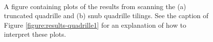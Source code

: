 \documentclass[12pt]{amsbook}
\theoremstyle{plain}
\theoremstyle{definition}
\theoremstyle{remark}
\begin{document}
\begin{figure}
\centering
{}\\
\caption{
\label{figure:results-quadrille2}
A figure containing plots of the results from scanning the (a) truncated quadrille and (b) snub quadrille tilings.  See the caption of Figure \ref{figure:results-quadrille1} for an explanation of how to interpret these plots.
}
\end{figure}
\end{document}
